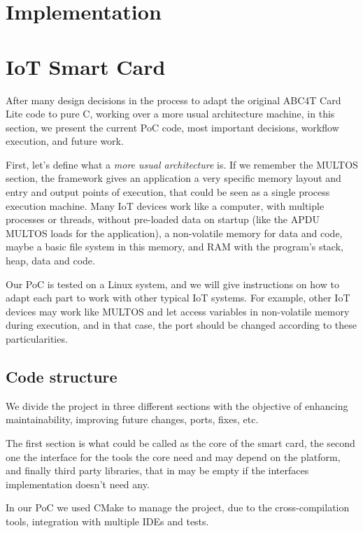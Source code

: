 \section{Implementation}


\section{IoT Smart Card}

After many design decisions in the process to adapt the original ABC4T Card Lite code to pure C, working over a more usual architecture machine, in this section, we present the current \ac{PoC} code, most important decisions, workflow execution, and future work.

First, let's define what a \textit{more usual architecture} is. If we remember the MULTOS section, the framework gives an application a very specific memory layout and entry and output points of execution, that could be seen as a single process execution machine. Many IoT devices work like a computer, with multiple processes or threads, without pre-loaded data on startup (like the APDU MULTOS loads for the application), a non-volatile memory for data and code, maybe a basic file system in this memory, and RAM with the program's stack, heap, data and code.

Our PoC is tested on a Linux system, and we will give instructions on how to adapt each part to work with other typical IoT systems.
For example, other IoT devices may work like MULTOS and let access variables in non-volatile memory during execution, and in that case, the port should be changed according to these particularities.


\hfil



\subsection{Code structure}


We divide the project in three different sections with the objective of enhancing maintainability, improving future changes, ports, fixes, etc.

The first section is what could be called as the core of the smart card, the second one the interface for the tools the core need and may depend on the platform, and finally third party libraries, that in may be empty if the interfaces implementation doesn't need any.


In our PoC we used CMake to manage the project, due to the cross-compilation tools, integration with multiple IDEs and tests.


